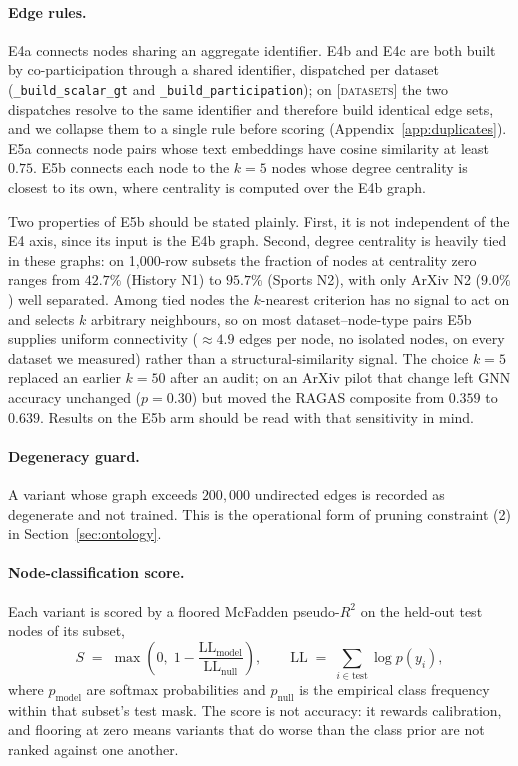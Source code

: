 \paragraph{Edge rules.}
E4a connects nodes sharing an aggregate identifier. E4b and E4c are both built
by co-participation through a shared identifier, dispatched per dataset
(\texttt{\_build\_scalar\_gt} and \texttt{\_build\_participation}); on
\textsc{[datasets]} the two dispatches resolve to the same identifier and
therefore build identical edge sets, and we collapse them to a single rule
before scoring (Appendix~\ref{app:duplicates}). E5a connects node pairs whose
text embeddings have cosine similarity at least $0.75$. E5b connects each node
to the $k=5$ nodes whose degree centrality is closest to its own, where
centrality is computed over the E4b graph.

Two properties of E5b should be stated plainly. First, it is not independent of
the E4 axis, since its input is the E4b graph. Second, degree centrality is
heavily tied in these graphs: on 1{,}000-row subsets the fraction of nodes at
centrality zero ranges from $42.7\%$ (History N1) to $95.7\%$ (Sports N2), with
only ArXiv N2 ($9.0\%$) well separated. Among tied nodes the $k$-nearest
criterion has no signal to act on and selects $k$ arbitrary neighbours, so on
most dataset--node-type pairs E5b supplies uniform connectivity ($\approx 4.9$
edges per node, no isolated nodes, on every dataset we measured) rather than a
structural-similarity signal. The choice $k=5$ replaced an earlier $k=50$ after
an audit; on an ArXiv pilot that change left GNN accuracy unchanged
($p=0.30$) but moved the RAGAS composite from $0.359$ to $0.639$. Results on
the E5b arm should be read with that sensitivity in mind.

\paragraph{Degeneracy guard.}
A variant whose graph exceeds $200{,}000$ undirected edges is recorded as
degenerate and not trained. This is the operational form of pruning constraint
(2) in Section~\ref{sec:ontology}.

\paragraph{Node-classification score.}
Each variant is scored by a floored McFadden pseudo-$R^2$ on the held-out test
nodes of its subset,
\begin{equation}
S \;=\; \max\!\left(0,\; 1 - \frac{\mathrm{LL}_{\text{model}}}{\mathrm{LL}_{\text{null}}}\right),
\qquad
\mathrm{LL} \;=\; \sum_{i \in \text{test}} \log p(y_i),
\end{equation}
where $p_{\text{model}}$ are softmax probabilities and $p_{\text{null}}$ is the
empirical class frequency within that subset's test mask. The score is not
accuracy: it rewards calibration, and flooring at zero means variants that do
worse than the class prior are not ranked against one another.

